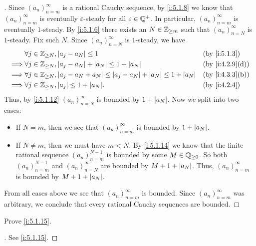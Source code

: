 \begin{proof}[]
  Since \((a_n)_{n = m}^{\infty}\) is a rational Cauchy sequence, by \cref{i:5.1.8} we know that \((a_n)_{n = m}^{\infty}\) is eventually \(\varepsilon\)-steady for all \(\varepsilon \in \mathbb{Q}^+\).
  In particular, \((a_n)_{n = m}^{\infty}\) is eventually \(1\)-steady.
  By \cref{i:5.1.6} there exists an \(N \in \mathbb{Z}_{\geq m}\) such that \((a_n)_{n = N}^{\infty}\) is \(1\)-steady.
  Fix such \(N\).
  Since \((a_n)_{n = N}^\infty\) is \(1\)-steady, we have
  \begin{align*}
             & \forall j \in \Z_{\geq N}, \abs{a_j - a_N} \leq 1                                                    &  & \by{i:5.1.3}    \\
    \implies & \forall j \in \Z_{\geq N}, \abs{a_j - a_N} + \abs{a_N} \leq 1 + \abs{a_N}                            &  & \by{i:4.2.9}[d] \\
    \implies & \forall j \in \Z_{\geq N}, \abs{a_j - a_N + a_N} \leq \abs{a_j - a_N} + \abs{a_N} \leq 1 + \abs{a_N} &  & \by{i:4.3.3}[b] \\
    \implies & \forall j \in \Z_{\geq N}, \abs{a_j} \leq 1 + \abs{a_N}.                                             &  & \by{i:4.2.4}
  \end{align*}
  Thus, by \cref{i:5.1.12} \((a_n)_{n = N}^\infty\) is bounded by \(1 + \left\lvert a_N\right\rvert\).
  Now we split into two cases:
  \begin{itemize}
    \item If \(N = m\), then we see that \((a_n)_{n = m}^\infty\) is bounded by \(1 + \left\lvert a_N\right\rvert\).
    \item If \(N \neq m\), then we must have \(m < N\).
          By \cref{i:5.1.14} we know that the finite rational sequence \((a_n)_{n = m}^{N - 1}\) is bounded by some \(M \in \mathbb{Q}_{\geq 0}\).
          So both \((a_n)_{n = m}^{N - 1}\) and \((a_n)_{n = N}^\infty\) are bounded by \(M + 1 + \left\lvert a_N\right\rvert\).
          Thus, \((a_n)_{n = m}^\infty\) is bounded by \(M + 1 + \left\lvert a_N\right\rvert\).
  \end{itemize}
  From all cases above we see that \((a_n)_{n = m}^\infty\) is bounded.
  Since \((a_n)_{n = m}^\infty\) was arbitrary, we conclude that every rational Cauchy sequences are bounded.
\end{proof}

\exercisesection

\begin{ex}\label{i:ex:5.1.1}
  Prove \cref{i:5.1.15}.
\end{ex}

\begin{proof}[]
  See \cref{i:5.1.15}.
\end{proof}
